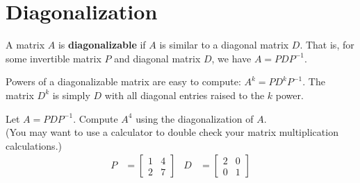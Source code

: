 

\newpage


\section{Diagonalization}
\name

\begin{boxdef}
	A matrix $A$ is \textbf{diagonalizable} if $A$ is similar to a diagonal matrix $D$. That is, for some invertible matrix $P$ and diagonal matrix $D$, we have $A=PDP^{-1}$.
\end{boxdef}
\vspace{-1em}
\begin{boxme}
	Powers of a diagonalizable matrix are easy to compute: $A^k = PD^kP^{-1}$.
	The matrix $D^k$ is simply $D$ with all diagonal entries raised to the $k$ power.
\end{boxme}


\begin{exercise} %
	Let $A=PDP^{-1}$. Compute $A^4$ using the diagonalization of $A$. \\
	(You may want to use a calculator to double check your matrix multiplication calculations.)
	\begin{align*}
	P &= \begin{bmatrix}1&4\\2&7\end{bmatrix} &
	D &= \begin{bmatrix}2&0\\0&1\end{bmatrix}%
	\end{align*}
\end{exercise}
\vfill



